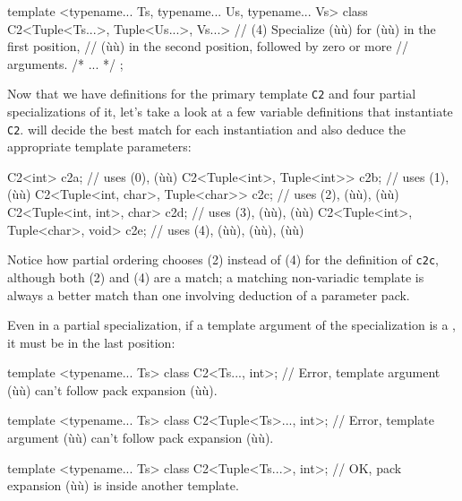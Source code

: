 \begin{emcppslisting}
template <typename... Ts, typename... Us, typename... Vs>
class C2<Tuple<Ts...>, Tuple<Us...>, Vs...>
    // (4) Specialize (ù{}ù) for (ù{}ù) in the first position,
    // (ù{}ù) in the second position, followed by zero or more
    // arguments.
{ /* ... */ };
\end{emcppslisting}
    

\noindent Now that we have definitions for the primary template \lstinline!C2! and
four partial specializations of it, let's take a look at a few variable
definitions that instantiate \lstinline!C2!.  will decide the
best match for each instantiation and also deduce the appropriate
template parameters:

\begin{emcppslisting}
C2<int>                           c2a;  // uses (0), (ù{}ù)
C2<Tuple<int>, Tuple<int>>        c2b;  // uses (1), (ù{}ù)
C2<Tuple<int, char>, Tuple<char>> c2c;  // uses (2), (ù{}ù), (ù{}ù)
C2<Tuple<int, int>, char>         c2d;  // uses (3), (ù{}ù), (ù{}ù)
C2<Tuple<int>, Tuple<char>, void> c2e;  // uses (4), (ù{}ù), (ù{}ù), (ù{}ù)
\end{emcppslisting}
    

\noindent Notice how partial ordering chooses (2) instead of (4) for the
definition of \lstinline!c2c!, although both (2) and (4) are a match; a
matching non-variadic template is always a better match than one
involving deduction of a parameter pack.

Even in a partial specialization, if a template argument of the
specialization is a , it must be in the last
position:

\begin{emcppslisting}
template <typename... Ts>
class C2<Ts..., int>;
    // Error, template argument (ù{}ù) can't follow pack expansion (ù{}ù).

template <typename... Ts>
class C2<Tuple<Ts>..., int>;
    // Error, template argument (ù{}ù) can't follow pack expansion (ù{}ù).

template <typename... Ts>
class C2<Tuple<Ts...>, int>;
    // OK, pack expansion (ù{}ù) is inside another template.
\end{emcppslisting}
    

